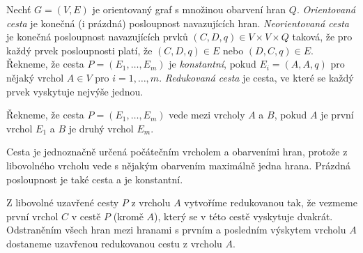 \begin{definice}
    Nechť $G = (V, E)$ je orientovaný graf s množinou obarvení hran $Q$.
    \emph{Orientovaná cesta} je konečná (i prázdná) posloupnost navazujících hran.
    \emph{Neorientovaná cesta} je konečná posloupnost navazujících prvků $(C,D,q) \in V \times V \times Q$ taková, že pro každý prvek posloupnosti platí, že $(C,D,q) \in E$ nebo $(D,C,q) \in E$. 
    Řekneme, že cesta $P = (E_1, \dots, E_m)$
    je \emph{konstantní}, pokud $E_i = (A,A,q)$ pro nějaký vrchol $A \in V$ pro $i = 1,\dots,m $. 
    \emph{Redukovaná cesta} je cesta, ve které se každý prvek vyskytuje nejvýše jednou.

    Řekneme, že cesta $P = (E_1, \dots, E_m)$ vede mezi vrcholy $A$ a $B$, pokud $A$ je první vrchol $E_1$ a $B$ je druhý vrchol $E_m$. 
\end{definice}
\begin{pozn}
    Cesta je jednoznačně určená počátečním vrcholem a obarveními hran, protože z libovolného vrcholu vede s nějakým obarvením maximálně jedna hrana. Prázdná posloupnost je také cesta a je konstantní. 
\end{pozn}
\begin{pozn}\label{pozn-redukce-cesty}
    Z libovolné uzavřené cesty $P$ z vrcholu $A$ vytvoříme redukovanou tak, že vezmeme první vrchol $C$ v cestě $P$ (kromě $A$), který se v této cestě vyskytuje dvakrát. Odstraněním všech hran mezi hranami s prvním a posledním výskytem vrcholu $A$ dostaneme uzavřenou redukovanou cestu z vrcholu $A$.
\end{pozn}
    
